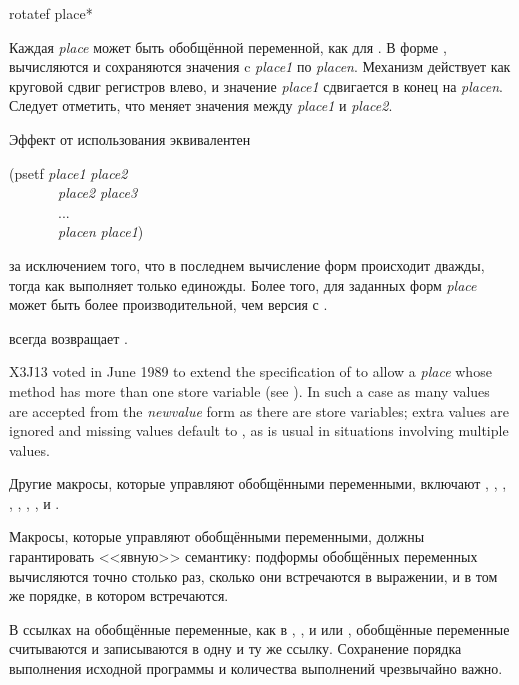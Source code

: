 \begin{defmac}
rotatef {place}*

Каждая \emph{place} может быть обобщённой переменной, как для .
В форме ,
вычисляются и сохраняются значения c \emph{place1} по \emph{placen}.
Механизм действует как круговой сдвиг регистров влево, и значение
\emph{place1} сдвигается в конец на \emph{placen}.
Следует отметить, что  меняет значения
между \emph{place1} и \emph{place2}.

Эффект от использования  эквивалентен
\begin{lisp}
(psetf \emph{place1} \emph{place2} \\
~~~~~~~\emph{place2} \emph{place3} \\
~~~~~~~... \\
~~~~~~~\emph{placen} \emph{place1})
\end{lisp}
за исключением того, что в последнем вычисление форм происходит дважды, тогда как  выполняет только единожды.
Более того, для заданных форм \emph{place}  может быть более
производительной, чем версия с .

 всегда возвращает {\false}.

\begin{newer}
X3J13 voted in June 1989 
to extend the specification of  to allow a \emph{place}
whose  method has more than one store variable (see ).
In such a case as many values are accepted from the \emph{newvalue} form
as there are store variables; extra values are ignored
and missing values default to ,
as is usual in situations involving multiple values.
\end{newer}
\end{defmac}

Другие макросы, которые управляют обобщёнными переменными, включают 
, ,
, , , ,
,  и .

Макросы, которые управляют обобщёнными переменными, должны гарантировать
<<явную>> семантику: подформы обобщённых переменных вычисляются точно столько
раз, сколько они встречаются в выражении, и в том же порядке, в котором
встречаются.

В ссылках на обобщённые переменные, как в , ,  и
 или , обобщённые переменные считываются и записываются в
одну и ту же ссылку. Сохранение порядка выполнения исходной программы и
количества выполнений чрезвычайно важно.


